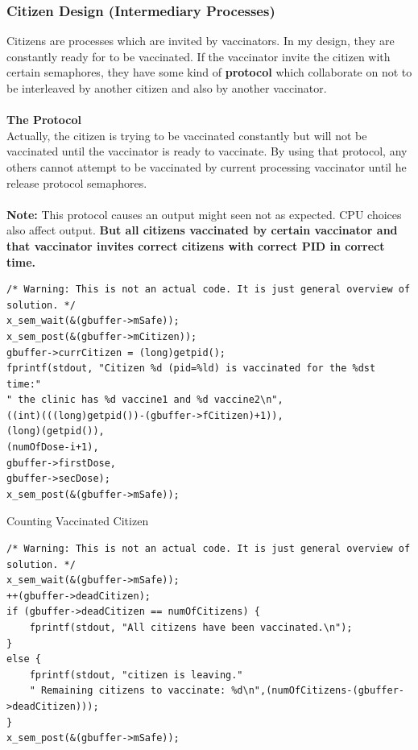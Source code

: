 \documentclass{article}
\begin{document}
\subsubsection{Citizen Design (Intermediary Processes)}
Citizens are processes which are invited by vaccinators. In my design, they are constantly ready for to be vaccinated. If the vaccinator invite the citizen with certain semaphores, they have some kind of \textbf{protocol} which collaborate on not to be interleaved by another citizen and also by another vaccinator.\\\\
\textbf{The Protocol}\\
Actually, the citizen is trying to be vaccinated constantly but will not be vaccinated until the vaccinator is ready to vaccinate. By using that protocol, any others cannot attempt to be vaccinated by current processing vaccinator until he release protocol semaphores.\\\\
\textbf{Note:} This protocol causes an output might seen not as expected. CPU choices also affect output.\textbf{ But all citizens vaccinated by certain vaccinator and that vaccinator invites correct citizens with correct PID in correct time.}
\begin{lstlisting}[style=CStyle]
/* Warning: This is not an actual code. It is just general overview of solution. */
x_sem_wait(&(gbuffer->mSafe));
x_sem_post(&(gbuffer->mCitizen));
gbuffer->currCitizen = (long)getpid();
fprintf(stdout, "Citizen %d (pid=%ld) is vaccinated for the %dst time:"
" the clinic has %d vaccine1 and %d vaccine2\n",
((int)(((long)getpid())-(gbuffer->fCitizen)+1)),
(long)(getpid()),
(numOfDose-i+1),
gbuffer->firstDose,
gbuffer->secDose);
x_sem_post(&(gbuffer->mSafe));
\end{lstlisting}
Counting Vaccinated Citizen
\begin{lstlisting}[style=CStyle]
/* Warning: This is not an actual code. It is just general overview of solution. */
x_sem_wait(&(gbuffer->mSafe));
++(gbuffer->deadCitizen);
if (gbuffer->deadCitizen == numOfCitizens) {
    fprintf(stdout, "All citizens have been vaccinated.\n");
}
else {
    fprintf(stdout, "citizen is leaving."
    " Remaining citizens to vaccinate: %d\n",(numOfCitizens-(gbuffer->deadCitizen)));
}
x_sem_post(&(gbuffer->mSafe));
\end{lstlisting}
\end{document}
